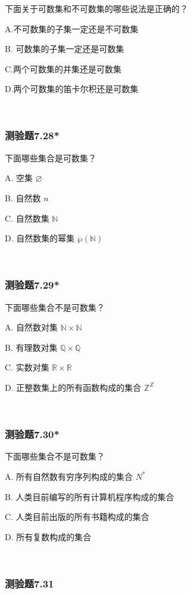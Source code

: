 \documentclass[UTF8, heading=true]{ctexart}
\begin{document}
下面关于可数集和不可数集的哪些说法是正确的？

A.不可数集的子集一定还是不可数集

B. 可数集的子集一定还是可数集

C.两个可数集的并集还是可数集

D.两个可数集的笛卡尔积还是可数集

\textcolor{white}{答案：BCD}

\subsubsection{测验题7.28*}

下面哪些集合是可数集？

A. 空集 $\varnothing$

B. 自然数 $n$

C. 自然数集 $\mathbb{N}$

D. 自然数集的幂集 $\wp(\mathbb{N})$

\textcolor{white}{答案：ABC}

\subsubsection{测验题7.29*}

下面哪些集合不是可数集？

A. 自然数对集 $\mathbb{N} \times \mathbb{N}$

B. 有理数对集 $\mathbb{Q} \times \mathbb{Q}$

C. 实数对集 $\mathbb{R} \times \mathbb{R}$

D. 正整数集上的所有函数构成的集合 $\mathbb{Z}^Z$

\textcolor{white}{答案：CD}

\subsubsection{测验题7.30*}

下面哪些集合不是可数集？

A. 所有自然数有穷序列构成的集合 $N^*$

B. 人类目前编写的所有计算机程序构成的集合

C. 人类目前出版的所有书籍构成的集合

D. 所有复数构成的集合

\textcolor{white}{答案：D}

\subsubsection{测验题7.31}
\end{document}
